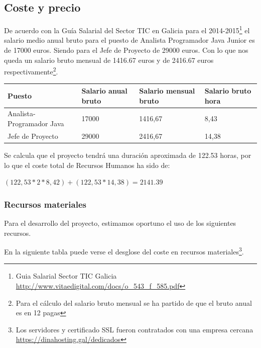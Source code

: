 \documentclass[12pt, a4paper, titlepage]{article}
\begin{document}
\subsection{Coste y precio}

De acuerdo con la Guía Salarial del Sector TIC en Galicia para el 2014-2015\footnote{Guia Salarial Sector TIC Galicia \url{http://www.vitaedigital.com/docs/o_543_f_585.pdf}} el salario medio anual bruto para el puesto de Analista Programador Java Junior es de 17000 euros. Siendo para el Jefe de Proyecto de 29000 euros. Con lo que nos queda un salario bruto mensual de 1416.67 euros y de 2416.67 euros respectivamente\footnote{Para el cálculo del salario bruto mensual se ha partido de que el bruto anual es en 12 pagas}.

\begin{center}

\begin{tabular}{|p{4.5cm}|p{3cm}|p{3cm}|p{2cm}|}
\hline 
Puesto & Salario anual bruto & Salario mensual bruto & Salario bruto hora \\ 
\hline 
Analista-Programador Java & 17000 & 1416,67 & 8,43\\ 
\hline 
Jefe de Proyecto & 29000 & 2416,67 & 14,38 \\ 
\hline 
\end{tabular} 
\end{center}

Se calcula que el proyecto tendrá una duración aproximada de 122.53 horas, por lo que el coste total de Recursos Humanos ha sido de:

$ (122,53*2*8,42)+(122,53*14,38) = 2141.39 $ 

\subsubsection{Recursos materiales}

Para el desarrollo del proyecto, estimamos oportuno el uso de los siguientes recursos.

En la siguiente tabla puede verse el desglose del coste en recursos materiales\footnote{Los servidores y certificado SSL fueron contratados con una empresa cercana \url{https://dinahosting.gal/dedicados}}.
\end{document}
